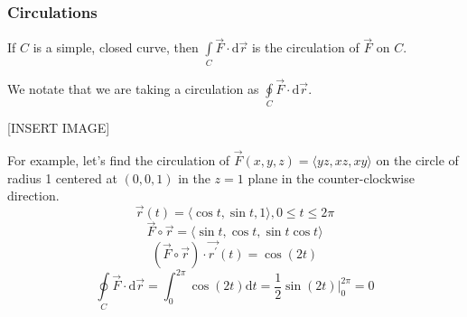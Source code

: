 \subsubsection{Circulations}
\begin{definition}
	If $C$ is a simple, closed curve, then $\int\limits_{C}{\vec{F} \cdot \mathrm{d}\vec{r}}$ is the circulation of $\vec{F}$ on $C$.
\end{definition}
\noindent
We notate that we are taking a circulation as $\oint\limits_{C}{\vec{F} \cdot \mathrm{d}\vec{r}}$.

[INSERT IMAGE]

\noindent
For example, let's find the circulation of $\vec{F}(x,y,z) = \langle yz, xz, xy \rangle$ on the circle of radius 1 centered at $(0,0,1)$ in the $z = 1$ plane in the counter-clockwise direction.
\begin{equation*}
	\vec{r}(t) = \langle \cos{t}, \sin{t}, 1 \rangle, 0 \leq t \leq 2\pi
\end{equation*}
\begin{equation*}
	\vec{F}\circ\vec{r} = \langle \sin{t}, \cos{t}, \sin{t}\cos{t} \rangle
\end{equation*}
\begin{equation*}
	\left(\vec{F}\circ\vec{r}\right) \cdot \vec{r^\prime}(t) = \cos{(2t)}
\end{equation*}
\begin{equation*}
	\oint\limits_{C}{\vec{F}\cdot\mathrm{d}\vec{r}} = \int_{0}^{2\pi}{\cos{(2t)}\mathrm{d}t} = \frac{1}{2}\sin{(2t)}\rvert_{0}^{2\pi} = 0
\end{equation*}